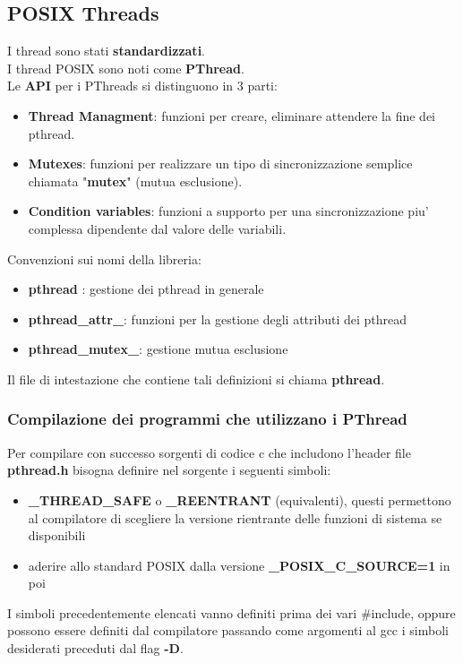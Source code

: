 \documentclass{article}
\begin{document}
    \subsection{POSIX Threads}
    I thread sono stati \textbf{standardizzati}.
    \\
    I thread POSIX sono noti come \textbf{PThread}.
    \\
    Le \textbf{API} per i PThreads si distinguono in 3 parti:
    \begin{itemize}
       \item \textbf{Thread Managment}: funzioni per creare, eliminare 
        attendere la fine dei pthread.
       \item \textbf{Mutexes}: funzioni per realizzare un tipo di sincronizzazione
       semplice chiamata "\textbf{mutex}" (mutua esclusione).
       \item \textbf{Condition variables}: funzioni a supporto per una sincronizzazione
       piu' complessa dipendente dal valore delle variabili.
    \end{itemize}
    Convenzioni sui nomi della libreria:
    \begin{itemize}
       \item \textbf{pthread} : gestione dei pthread in generale
       \item \textbf{pthread\_attr\_}: funzioni per la gestione degli attributi
       dei pthread
       \item \textbf{pthread\_mutex\_}: gestione mutua esclusione
    \end{itemize}
    Il file di intestazione che contiene tali definizioni si chiama 
    \textbf{pthread}.


    \subsubsection{Compilazione dei programmi che utilizzano i PThread}
    Per compilare con successo sorgenti di codice c che includono l'header file
    \textbf{pthread.h} bisogna definire nel sorgente i seguenti simboli:
    \begin{itemize}
       \item \textbf{\_THREAD\_SAFE} o \textbf{\_REENTRANT} (equivalenti),
       questi permettono al compilatore di scegliere la versione rientrante 
       delle funzioni di sistema se disponibili
       \item aderire allo standard POSIX dalla versione \textbf{\_POSIX\_C\_SOURCE=1} 
       in poi
    \end{itemize}
    I simboli precedentemente elencati vanno definiti prima dei vari \#include,
    oppure possono essere definiti dal compilatore passando come argomenti al gcc
    i simboli desiderati preceduti dal flag \textbf{-D}.
\end{document}
